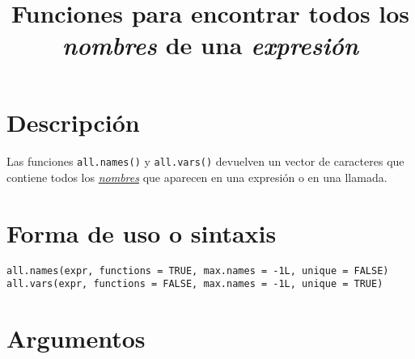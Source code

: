 \documentclass{article}[letter, 12pt]
\makeatletter
\def\code#1{\texttt{#1}}
\renewcommand{\maketitle}{\bgroup\setlength{\parindent}{0pt}
\begin{flushleft}
  \textbf{\@title}
  \@author
\end{flushleft}\egroup
}
\makeatother
\begin{document}
	\title{\Huge{Funciones para encontrar todos los \textit{nombres} de una \textit{expresión}}}
	\maketitle
	\section{\color{gray}Descripción}
	\paragraph{}
Las funciones \code{all.names()} y \code{all.vars()} devuelven un vector de caracteres que contiene todos los \href{run:/Vocabulary.pdf}{\textit{nombres}} que aparecen en una expresión o en una llamada.
\tableofcontents{}
\section{\color{gray}Forma de uso o sintaxis}
\code{all.names(expr, functions = TRUE, max.names = -1L, unique = FALSE)}\\
\code{all.vars(expr, functions = FALSE, max.names = -1L, unique = TRUE)}\\

\section{\color{gray}Argumentos}
\end{document}
